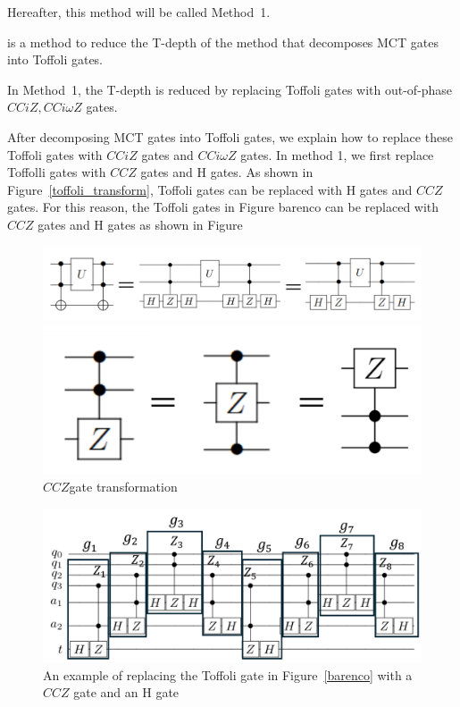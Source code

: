 Hereafter, this method will be called Method~1.

is a method to reduce the T-depth of the method \cite{barenco1995elementary} that decomposes MCT gates into Toffoli gates.

In Method~1, the T-depth is reduced by replacing Toffoli gates with out-of-phase $CCiZ, CCi\omega Z$ gates.
\par
After decomposing MCT gates into Toffoli gates,
we explain how to replace these Toffoli gates with $CCiZ$ gates and $CCi\omega Z$ gates.
In method 1, we first replace Toffolli gates with $CCZ$ gates and H gates.
As shown in Figure~\ref{toffoli_transform}, Toffoli gates can be replaced with H gates and $CCZ$ gates.
For this reason, the Toffoli gates in Figure barenco can be replaced with $CCZ$ gates and H gates as shown in Figure~\cite{toffoli_to_ccz} \begin{figure}[tbp] \centering \begin{minipage}[b]{0.8\columnwidth} \centering \includegraphics[width=0.9\columnwidth]{img/toffoli_transform.pdf} \caption{Replacement of Toffoli gate with $CCZ$ gate} \label{toffoli_transform} \end{minipage} \begin{minipage}[b]{0.4\columnwidth} \centering \includegraphics[width=0.9\columnwidth]{img/zgate_transform.pdf} \caption{$CCZ$gate transformation} \label{zgate_transform} \end{minipage} \end{figure} \begin{figure}[tbp] \centering \includegraphics[width=13cm]{img/toffoli_to_ccz.pdf} \caption{An example of replacing the Toffoli gate in Figure~\ref{barenco} with a $CCZ$ gate and an H gate}
\label{toffoli_to_ccz}
\end{figure}
